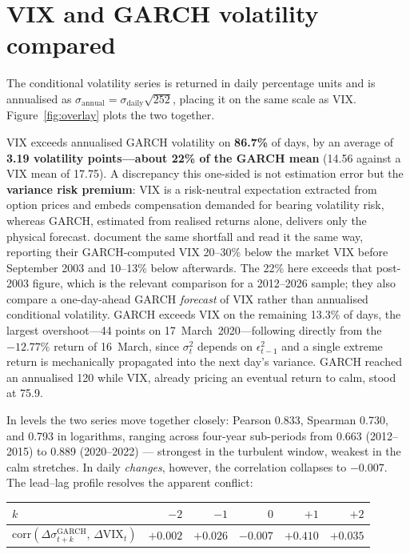 \documentclass[10pt,a4paper]{article}
\begin{document}
\section{VIX and GARCH volatility compared}

The conditional volatility series is returned in daily percentage units and is
annualised as $\sigma_{\text{annual}} = \sigma_{\text{daily}}\sqrt{252}$, placing it on
the same scale as VIX. Figure~\ref{fig:overlay} plots the two together.

VIX exceeds annualised GARCH volatility on \textbf{86.7\%} of days, by an average of
\textbf{3.19 volatility points---about 22\% of the GARCH mean} (14.56 against a VIX mean
of 17.75). A discrepancy this one-sided is not estimation error but the \textbf{variance
risk premium}: VIX is a risk-neutral expectation extracted from option prices and embeds
compensation demanded for bearing volatility risk, whereas GARCH, estimated from realised
returns alone, delivers only the physical forecast. \citet{liu2015} document the same shortfall and read it the same
way, reporting their GARCH-computed VIX 20--30\% below the market VIX before September
2003 and 10--13\% below afterwards. The 22\% here exceeds that post-2003 figure, which
is the relevant comparison for a 2012--2026 sample; they also compare a one-day-ahead
GARCH \emph{forecast} of VIX rather than annualised conditional volatility. GARCH exceeds VIX on the remaining 13.3\% of
days, the largest overshoot---44 points on 17~March~2020---following directly from the
$-12.77\%$ return of 16~March, since $\sigma_t^2$ depends on $\epsilon_{t-1}^2$ and a
single extreme return is mechanically propagated into the next day's variance. GARCH
reached an annualised 120 while VIX, already pricing an eventual return to calm, stood
at 75.9.

In levels the two series move together closely: Pearson 0.833, Spearman 0.730, and 0.793
in logarithms, ranging across four-year sub-periods from 0.663 (2012--2015) to 0.889
(2020--2022) --- strongest in the turbulent window, weakest in the calm stretches. In
daily \emph{changes}, however, the correlation collapses to $-0.007$. The lead--lag
profile resolves the apparent conflict:

\begin{table}[H]
\centering\small
\begin{tabular}{lrrrrr}
\toprule
$k$ & $-2$ & $-1$ & $0$ & $+1$ & $+2$ \\
\midrule
$\mathrm{corr}(\Delta\sigma^{\text{GARCH}}_{t+k},\, \Delta \text{VIX}_t)$
 & $+0.002$ & $+0.026$ & $-0.007$ & $\mathbf{+0.410}$ & $+0.035$ \\
\bottomrule
\end{tabular}
\end{table}
\end{document}
